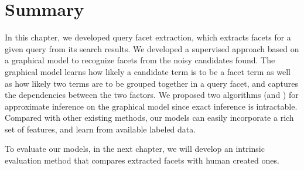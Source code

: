 \section{Summary}
In this chapter, we developed query facet extraction, which extracts facets for a given query from its search results. We developed a supervised approach based on a graphical model to recognize facets from the noisy candidates found. The graphical model learns how likely a candidate term is to be a facet term as well as how likely two terms are to be grouped together in a query facet, and captures the dependencies between the two factors. We proposed two algorithms (\QFI and \QFJ) for approximate inference on the graphical model since exact inference is intractable. Compared with other existing methods, our models can easily incorporate a rich set of features, and learn from available labeled data.

To evaluate our models, in the next chapter, we will develop an intrinsic evaluation method that compares extracted facets with human created ones.
